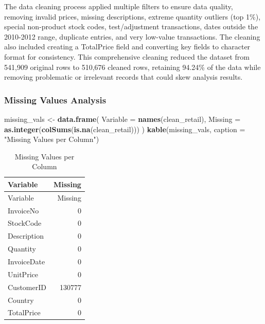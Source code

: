 \documentclass[
]{article}
\newenvironment{Shaded}{\begin{snugshade}}{\end{snugshade}}
\newcommand{\AttributeTok}[1]{\textcolor[rgb]{0.13,0.29,0.53}{#1}}
\newcommand{\FunctionTok}[1]{\textcolor[rgb]{0.13,0.29,0.53}{\textbf{#1}}}
\newcommand{\NormalTok}[1]{#1}
\newcommand{\OtherTok}[1]{\textcolor[rgb]{0.56,0.35,0.01}{#1}}
\newcommand{\StringTok}[1]{\textcolor[rgb]{0.31,0.60,0.02}{#1}}
\begin{document}
The data cleaning process applied multiple filters to ensure data
quality, removing invalid prices, missing descriptions, extreme quantity
outliers (top 1\%), special non-product stock codes, test/adjustment
transactions, dates outside the 2010-2012 range, duplicate entries, and
very low-value transactions. The cleaning also included creating a
TotalPrice field and converting key fields to character format for
consistency. This comprehensive cleaning reduced the dataset from
541,909 original rows to 510,676 cleaned rows, retaining 94.24\% of the
data while removing problematic or irrelevant records that could skew
analysis results.\newpage

\subsubsection{Missing Values Analysis}\label{missing-values-analysis}

\begin{Shaded}
\begin{Highlighting}[]
\NormalTok{missing\_vals }\OtherTok{\textless{}{-}} \FunctionTok{data.frame}\NormalTok{(}
  \AttributeTok{Variable =} \FunctionTok{names}\NormalTok{(clean\_retail),}
  \AttributeTok{Missing =} \FunctionTok{as.integer}\NormalTok{(}\FunctionTok{colSums}\NormalTok{(}\FunctionTok{is.na}\NormalTok{(clean\_retail)))}
\NormalTok{)}
\FunctionTok{kable}\NormalTok{(missing\_vals, }\AttributeTok{caption =} \StringTok{"Missing Values per Column"}\NormalTok{)}
\end{Highlighting}
\end{Shaded}

\begin{longtable}[]{@{}lr@{}}
\caption{Missing Values per Column}\tabularnewline
\toprule\noalign{}
Variable & Missing \\
\midrule\noalign{}
\endfirsthead
\toprule\noalign{}
Variable & Missing \\
\midrule\noalign{}
\endhead
\bottomrule\noalign{}
\endlastfoot
InvoiceNo & 0 \\
StockCode & 0 \\
Description & 0 \\
Quantity & 0 \\
InvoiceDate & 0 \\
UnitPrice & 0 \\
CustomerID & 130777 \\
Country & 0 \\
TotalPrice & 0 \\
\end{longtable}
\end{document}
